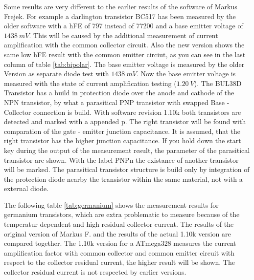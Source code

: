 Some results are very different to the earlier results of the software of Markus Frejek.
For example a darlington transistor BC517 has been measured by the older software
with a hFE of 797 instead of 77200 and a base emitter voltage of \(1438~mV\).
This will be caused by the additional measurement of current amplification with the
common collector circuit.
Also the new version shows the same low hFE result with the common emitter circiut,
as you can see in the last column of table \ref{tab:bipolar}.
The base emitter voltage is measured by the older Version as separate diode test with \(1438~mV\).
Now the base emitter voltage is measured with the state of current amplification testing (\(1.20~V\)).
The BUL38D Transistor has a build in protection diode over the anode and cathode of the NPN transistor,
by what a parasitical PNP transistor with swapped Base - Collector connection is build.
With software revision 1.10k both transistors are detected and marked
with a appended p.
The right transistor will be found with comparation of the gate - emitter junction capacitance.
It is assumed, that the right transistor has the higher junction capacitance.
If you hold down the start key during the output of the measurement result, the parameter of
the parasitical transistor are shown. With the label PNPn the existance of another transistor will be marked.
The parasitical transistor structure is build only by integration of the protection diode nearby
the transistor within the same material, not with a external diode.

The following table \ref{tab:germanium} shows the measurement results for germanium transistors, which are extra problematic
to measure because of the temperatur dependent and high residual collector current.
The results of the original version of Markus F. and the results of the actual 1.10k version are
compared together. The 1.10k version for a ATmega328 measures the current amplification factor with
common collector and common emitter circuit with respect to the collector residual current,
the higher result will be shown.
The collector residual current is not respected by earlier versions.

